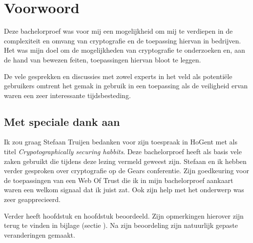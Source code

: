 
\chapter*{Voorwoord}
\label{ch:voorwoord}


Deze bachelorproef was voor mij een mogelijkheid om mij te verdiepen in de
complexiteit en omvang van cryptografie en de toepassing hiervan in bedrijven.
Het was mijn doel om de mogelijkheden van cryptografie te onderzoeken en, aan de
hand van bewezen feiten, toepassingen hiervan bloot te leggen.

De vele gesprekken en discussies met zowel experts in het veld als potentiële
gebruikers omtrent het gemak in gebruik in een toepassing als de veiligheid
ervan waren een zeer interessante tijdsbesteding.

\section*{Met speciale dank aan}
Ik zou graag Stefaan Truijen bedanken voor zijn toespraak in HoGent met als
titel \textit{Crypotographically securing habbits}. Deze bachelorproef heeft als
basis vele zaken gebruikt die tijdens deze lezing vermeld geweest zijn. Stefaan
en ik hebben verder gesproken over cryptografie op de Gears conferentie. Zijn
goedkeuring voor de toepassingen van een Web Of Trust die ik in mijn
bachelorproef aankaart waren een welkom signaal dat ik juist zat. Ook zijn help
met het onderwerp \textit{}  was
zeer geapprecieerd.

Verder heeft \textcite{TruijenStefaan} hoofdstuk
 en hoofdstuk
 beoordeeld. Zijn opmerkingen
hierover zijn terug te vinden in bijlage (sectie
). Na zijn beoordeling zijn
natuurlijk gepaste veranderingen gemaakt.
